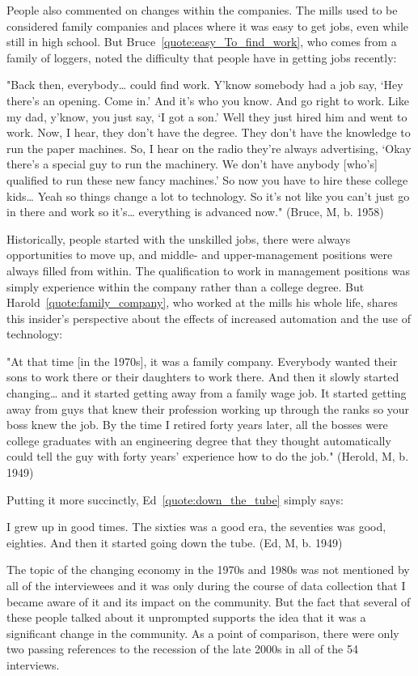 People also commented on changes within the companies. The mills used to be considered family companies and places where it was easy to get jobs, even while still in high school. But Bruce~\ref{quote:easy_To_find_work}, who comes from a family of loggers, noted the difficulty that people have in getting jobs recently:
\begin{num_quote}
    "Back then, everybody… could find work. Y'know somebody had a job say, ‘Hey there's an opening. Come in.' And it's who you know. And go right to work. Like my dad, y'know, you just say, ‘I got a son.' Well they just hired him and went to work. Now, I hear, they don't have the degree. They don't have the knowledge to run the paper machines. So, I hear on the radio they're always advertising, ‘Okay there's a special guy to run the machinery. We don't have anybody [who's] qualified to run these new fancy machines.' So now you have to hire these college kids… Yeah so things change a lot to technology. So it's not like you can't just go in there and work so it's… everything is advanced now." (Bruce, M, b. 1958)
\label{quote:easy_To_find_work}
\end{num_quote}
Historically, people started with the unskilled jobs, there were always opportunities to move up, and middle- and upper-management positions were always filled from within. The qualification to work in management positions was simply experience within the company rather than a college degree. But Harold~\ref{quote:family_company}, who worked at the mills his whole life, shares this insider's perspective about the effects of increased automation and the use of technology:
\begin{num_quote}
    "At that time [in the 1970s], it was a family company. Everybody wanted their sons to work there or their daughters to work there. And then it slowly started changing… and it started getting away from a family wage job. It started getting away from guys that knew their profession working up through the ranks so your boss knew the job. By the time I retired forty years later, all the bosses were college graduates with an engineering degree that they thought automatically could tell the guy with forty years' experience how to do the job." (Herold, M, b. 1949)
\label{quote:family_company}
\end{num_quote}
Putting it more succinctly, Ed~\ref{quote:down_the_tube} simply says:
\begin{num_quote}
I grew up in good times. The sixties was a good era, the seventies was good, eighties. And then it started going down the tube. (Ed, M, b. 1949)
\label{quote:down_the_tube}
\end{num_quote}
The topic of the changing economy in the 1970s and 1980s was not mentioned by all of the interviewees and it was only during the course of data collection that I became aware of it and its impact on the community. But the fact that several of these people talked about it unprompted supports the idea that it was a significant change in the community. As a point of comparison, there were only two passing references to the recession of the late 2000s in all of the 54 interviews.

